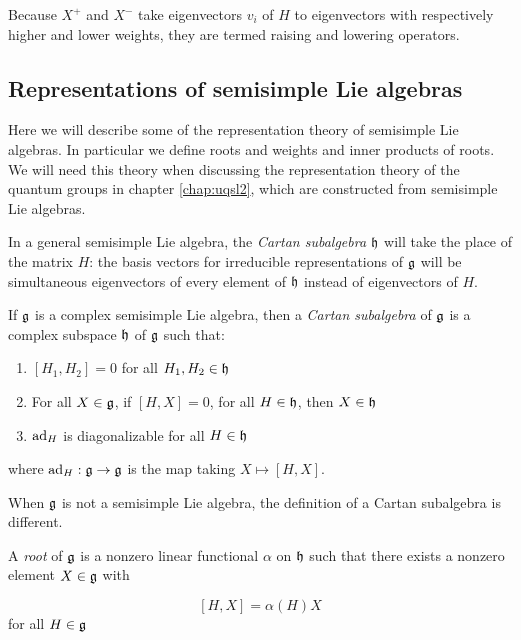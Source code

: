 Because $X^+$ and $X^-$ take eigenvectors $v_i$ of $H$ to eigenvectors with
respectively higher and lower weights, they are termed raising and lowering
operators.

\subsection{Representations of semisimple Lie algebras}

Here we will describe some of the representation theory of semisimple Lie
algebras. In particular we define roots and weights and inner products of roots.
We will need this theory when discussing the representation theory of the
quantum groups in chapter \ref{chap:uqsl2}, which are constructed from
semisimple Lie algebras. 

In a general semisimple Lie algebra, the \emph{Cartan subalgebra}
$\mathfrak{h}$ will take the place of the matrix $H$: the basis vectors for
irreducible representations of $\mathfrak{g}$ will be simultaneous eigenvectors of
every element of $\mathfrak{h}$ instead of eigenvectors of $H$.

\begin{defn}
    If $\mathfrak{g}$ is a complex semisimple Lie algebra, then a \emph{Cartan
        subalgebra} of $\mathfrak{g}$ is a complex subspace $\mathfrak{h}$ of
        $\mathfrak{g}$ such that: 
    \begin{enumerate}
        \renewcommand{\labelenumi}{\roman{enumi})}
        \item $\left[ H_1, H_2 \right] = 0$ for all $H_1, H_2 \in \mathfrak{h}$
        \item For all $X \in \mathfrak{g}$, if $\left[ H,X \right] = 0$, for all $H
            \in \mathfrak{h}$, then $X \in \mathfrak{h}$
        \item $\operatorname{ad}_H$ is diagonalizable for all $H \in \mathfrak{h}$
    \end{enumerate}
where $\operatorname{ad}_H: \mathfrak{g} \to \mathfrak{g}$ is the map taking $X \mapsto [H,X]$.
\end{defn}

When $\mathfrak{g}$ is not a semisimple Lie algebra, the definition of a Cartan
subalgebra is different.

\begin{defn}
A \emph{root} of $\mathfrak{g}$ is a nonzero linear functional $\alpha$ on $\mathfrak{h}$ such that there exists a nonzero element $X \in \mathfrak{g}$ with 

\begin{equation}
\left[ H,X \right] = \alpha(H)X
\end{equation}
for all $H \in \mathfrak{g}$
\end{defn}

